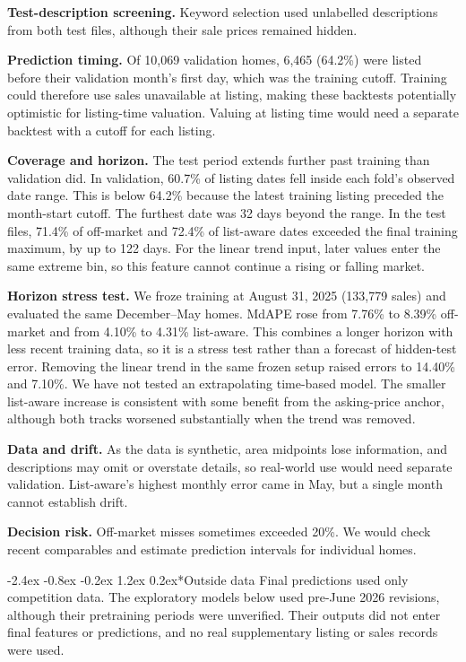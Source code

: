 \documentclass[11pt,a4paper]{article}
\makeatletter
\renewcommand\section{\@startsection{section}{1}{\z@}
  {-2.4ex \@plus -0.8ex \@minus -0.2ex}
  {1.2ex \@plus 0.2ex}{\normalfont\Large\bfseries}}
\makeatother
\begin{document}
\textbf{Test-description screening.} Keyword selection used unlabelled descriptions from both
test files, although their sale prices remained hidden.

\textbf{Prediction timing.} Of 10,069 validation homes, 6,465 (64.2\%) were listed before their
validation month's first day, which was the training cutoff. Training could therefore use sales
unavailable at listing, making these backtests potentially optimistic for listing-time valuation.
Valuing at listing time would need a separate backtest with a cutoff for each listing.

\textbf{Coverage and horizon.} The test period extends further past training than validation did.
In validation, 60.7\% of listing dates fell inside each fold's observed date range. This is below
64.2\% because the latest training listing preceded the month-start cutoff. The furthest date was
32 days beyond the range. In the test files, 71.4\% of off-market and 72.4\% of list-aware dates
exceeded the final training maximum, by up to 122 days. For the linear trend input, later values
enter the same extreme bin, so this feature cannot continue a rising or falling market.

\textbf{Horizon stress test.} We froze training at August 31, 2025 (133,779 sales) and evaluated the
same December--May homes. MdAPE rose from 7.76\% to 8.39\% off-market and from 4.10\% to 4.31\%
list-aware. This combines a longer horizon with less recent training data, so it is a stress test
rather than a forecast of hidden-test error. Removing the linear trend in the same frozen setup
raised errors to 14.40\% and 7.10\%. We have not tested an extrapolating time-based model.
The smaller list-aware increase is consistent with some benefit from the asking-price
anchor, although both tracks worsened substantially when the trend was removed.

\textbf{Data and drift.} As the data is synthetic, area midpoints lose information, and descriptions
may omit or overstate details, so real-world use would need separate validation. List-aware's
highest monthly error came in May, but a single month cannot establish drift.

\textbf{Decision risk.} Off-market misses sometimes exceeded 20\%. We would check recent
comparables and estimate prediction intervals for individual homes.

\section*{Outside data}
Final predictions used only competition data. The exploratory models below used pre-June 2026
revisions, although their pretraining periods were unverified.
Their outputs did not enter final features or predictions, and no real supplementary listing or sales records were used.
\end{document}
